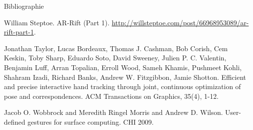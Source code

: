 \begin{frame}[allowframebreaks]{Bibliographie}
\begin{thebibliography}{10}
      William Steptoe.
      \newblock AR-Rift (Part 1).
      \newblock \url{http://willsteptoe.com/post/66968953089/ar-rift-part-1}.

      Jonathan Taylor, Lucas Bordeaux, Thomas J. Cashman, Bob Corish, Cem Keskin, Toby Sharp, Eduardo Soto, David Sweeney, Julien P. C. Valentin, Benjamin Luff, Arran Topalian, Erroll Wood, Sameh Khamis, Pushmeet Kohli, Shahram Izadi, Richard Banks, Andrew W. Fitzgibbon, Jamie Shotton.
      \newblock Efficient and precise interactive hand tracking through joint, continuous optimization of pose and correspondences.
      \newblock ACM Transactions on Graphics, 35(4), 1-12.

      Jacob O. Wobbrock and Meredith Ringel Morris and Andrew D. Wilson.
      \newblock User-defined gestures for surface computing.
      \newblock CHI 2009.
  \end{thebibliography}
\end{frame}